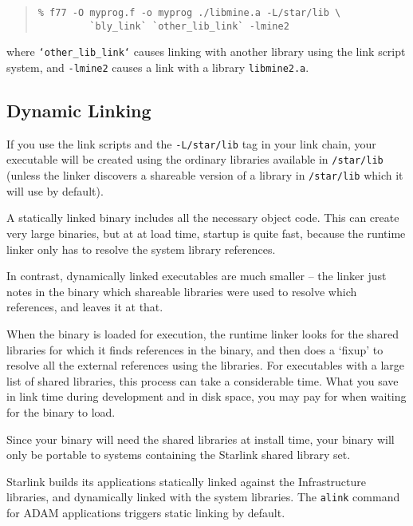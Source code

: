 \documentclass[twoside,11pt]{article}
\newcommand{\xlabel}[1]{}
\begin{document}
\begin{quote}
\begin{verbatim}
% f77 -O myprog.f -o myprog ./libmine.a -L/star/lib \
         `bly_link` `other_lib_link` -lmine2
\end{verbatim}
\end{quote}

where \texttt{`other\_lib\_link`} causes linking with another library
using the link script system, and \texttt{-lmine2} causes a link with a
library \texttt{libmine2.a}.

\subsection{\xlabel{dynamic_linking}Dynamic Linking}
\label{dynamic_linking}

If you use the link scripts and the \texttt{-L/star/lib} tag in your link
chain, your executable will be created using the ordinary libraries
available in \texttt{/star/lib} (unless the linker discovers a shareable 
version of a library in \texttt{/star/lib} which it will use by default).

A statically linked binary includes all the necessary object code.  This
can create very large binaries, but at at load time, startup is quite
fast, because the runtime linker only has to resolve the system library
references. 

In contrast, dynamically linked executables are much smaller -- the
linker just notes in the binary which shareable libraries were used to
resolve which references, and leaves it at that.

When the binary is loaded for execution, the runtime linker looks for the
shared libraries for which it finds references in the binary, and then does a
`fixup' to resolve all the external references using the libraries.  For
executables with a large list of shared libraries, this process can take a
considerable time.  What you save in link time during development and in
disk space, you may pay for when waiting for the binary to load. 

Since your binary will need the shared libraries at install time, your
binary will only be portable to systems containing the Starlink shared
library set.

Starlink builds its applications statically linked against the
Infrastructure libraries, and dynamically linked with the system
libraries.  The \texttt{alink} command for ADAM applications triggers static
linking by default. 
\end{document}
